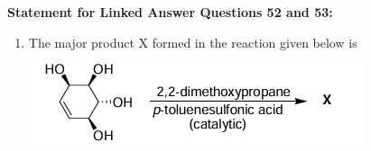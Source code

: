 \documentclass[journal,12pt,onecolumn]{IEEEtran}
\theoremstyle{remark}
\begin{document}
\textbf{Statement for Linked Answer Questions 52 and 53:}
\begin{enumerate}[resume]
\item The major product X formed in the reaction given below is
    \begin{center}
        \includegraphics[width=0.8\columnwidth]{figs/q52.png}
    \end{center}
    \begin{enumerate}
      \begin{multicols}{2}
          

\end{multicols}
\end{enumerate}
\end{enumerate}
\end{document}

